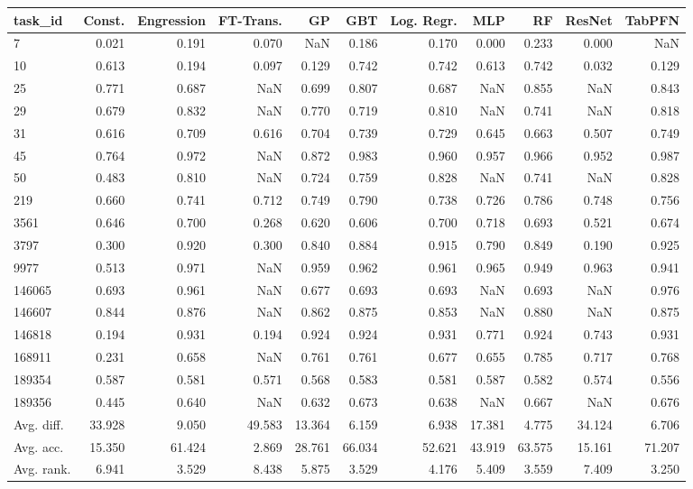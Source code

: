 \begin{tabular}{lrrrrrrrrrr}
\toprule
task\_id & Const. & Engression & FT-Trans. & GP & GBT & Log. Regr. & MLP & RF & ResNet & TabPFN \\
\midrule
7 & 0.021 & 0.191 & 0.070 & NaN & 0.186 & 0.170 & 0.000 & 0.233 & 0.000 & NaN \\
10 & 0.613 & 0.194 & 0.097 & 0.129 & 0.742 & 0.742 & 0.613 & 0.742 & 0.032 & 0.129 \\
25 & 0.771 & 0.687 & NaN & 0.699 & 0.807 & 0.687 & NaN & 0.855 & NaN & 0.843 \\
29 & 0.679 & 0.832 & NaN & 0.770 & 0.719 & 0.810 & NaN & 0.741 & NaN & 0.818 \\
31 & 0.616 & 0.709 & 0.616 & 0.704 & 0.739 & 0.729 & 0.645 & 0.663 & 0.507 & 0.749 \\
45 & 0.764 & 0.972 & NaN & 0.872 & 0.983 & 0.960 & 0.957 & 0.966 & 0.952 & 0.987 \\
50 & 0.483 & 0.810 & NaN & 0.724 & 0.759 & 0.828 & NaN & 0.741 & NaN & 0.828 \\
219 & 0.660 & 0.741 & 0.712 & 0.749 & 0.790 & 0.738 & 0.726 & 0.786 & 0.748 & 0.756 \\
3561 & 0.646 & 0.700 & 0.268 & 0.620 & 0.606 & 0.700 & 0.718 & 0.693 & 0.521 & 0.674 \\
3797 & 0.300 & 0.920 & 0.300 & 0.840 & 0.884 & 0.915 & 0.790 & 0.849 & 0.190 & 0.925 \\
9977 & 0.513 & 0.971 & NaN & 0.959 & 0.962 & 0.961 & 0.965 & 0.949 & 0.963 & 0.941 \\
146065 & 0.693 & 0.961 & NaN & 0.677 & 0.693 & 0.693 & NaN & 0.693 & NaN & 0.976 \\
146607 & 0.844 & 0.876 & NaN & 0.862 & 0.875 & 0.853 & NaN & 0.880 & NaN & 0.875 \\
146818 & 0.194 & 0.931 & 0.194 & 0.924 & 0.924 & 0.931 & 0.771 & 0.924 & 0.743 & 0.931 \\
168911 & 0.231 & 0.658 & NaN & 0.761 & 0.761 & 0.677 & 0.655 & 0.785 & 0.717 & 0.768 \\
189354 & 0.587 & 0.581 & 0.571 & 0.568 & 0.583 & 0.581 & 0.587 & 0.582 & 0.574 & 0.556 \\
189356 & 0.445 & 0.640 & NaN & 0.632 & 0.673 & 0.638 & NaN & 0.667 & NaN & 0.676 \\
Avg. diff. & 33.928 & 9.050 & 49.583 & 13.364 & 6.159 & 6.938 & 17.381 & 4.775 & 34.124 & 6.706 \\
Avg. acc. & 15.350 & 61.424 & 2.869 & 28.761 & 66.034 & 52.621 & 43.919 & 63.575 & 15.161 & 71.207 \\
Avg. rank. & 6.941 & 3.529 & 8.438 & 5.875 & 3.529 & 4.176 & 5.409 & 3.559 & 7.409 & 3.250 \\
\bottomrule
\end{tabular}
